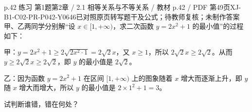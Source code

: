 \par\noindent\begin{minipage}{\linewidth}
\begin{bankitem}{p.42 练习 第1题}{第2章 / 2.1 相等关系与不等关系 / 教材 p.42 / PDF 第49页}{XJ-B1-C02-PR-P042-Y0646}{已对照原页转写题干及公式；待教师复核；未制作答案}
甲、乙两同学分别解“设 $x\in[1,+\infty)$，求二次函数 $y=2x^2+1$ 的最小值”的过程如下：
\par 甲：$y=2x^2+1\ge2\sqrt{2x^2\cdot1}=2\sqrt2x$，又 $x\ge1$，所以 $2\sqrt2x\ge2\sqrt2$。从而 $y\ge2\sqrt2x\ge2\sqrt2$，即 $y$ 的最小值是 $2\sqrt2$。
\par 乙：因为函数 $y=2x^2+1$ 在区间 $[1,+\infty)$ 上的图象随着 $x$ 增大而逐渐上升，即 $y$ 随 $x$ 增大而增大，所以 $y$ 的最小值是 $2\times1^2+1=3$。
\par 试判断谁错，错在何处？
\end{bankitem}
\end{minipage}\par\medskip
